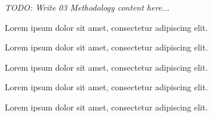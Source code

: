 \textit{TODO: Write 03 Methodology content here...}
\par Lorem ipsum dolor sit amet, consectetur adipiscing elit. \par Lorem ipsum dolor sit amet, consectetur adipiscing elit. \par Lorem ipsum dolor sit amet, consectetur adipiscing elit. \par Lorem ipsum dolor sit amet, consectetur adipiscing elit. \par Lorem ipsum dolor sit amet, consectetur adipiscing elit. 
